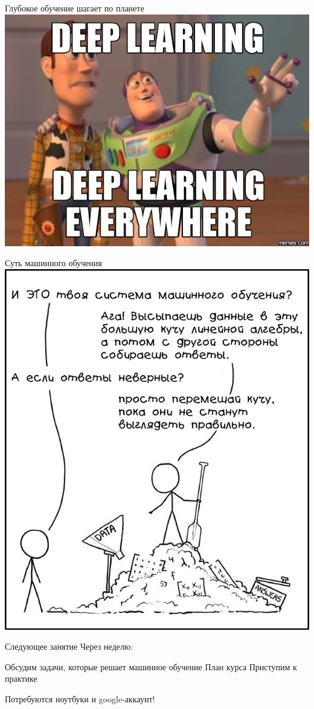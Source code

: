 \documentclass[aspectratio=169, professionalfonts]{beamer}
\begin{document}
\begin{frame}{Глубокое обучение шагает по планете}
    \centering
    \includegraphics[width=.6\linewidth]{graphs/fig36.jpg}
\end{frame}

\begin{frame}{Суть машинного обучения}
    \centering
    \includegraphics[width=.4\linewidth]{graphs/fig37.jpg}
\end{frame}

\begin{frame}{Следующее занятие}
    Через неделю:
    \begin{outline}
        \1 Обсудим задачи, которые решает машинное обучение
        \1 План курса
        \1 Приступим к практике
    \end{outline}
    Потребуются ноутбуки и google-аккаунт!
\end{frame}
\end{document}
